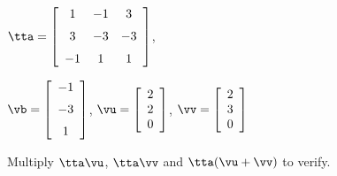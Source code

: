 {$\tta = \left[ \begin {array}{ccc} 1 & -1 & 3 \\ \noalign{\medskip} 3&-3&-3\\ \noalign{\medskip} -1&1&1 \end {array} \right] $, 

$\vb=\left[ \begin {array}{c} -1\\ \noalign{\medskip} -3 \\ \noalign{\medskip} 1 \end {array} \right] $, 
$\vu = \left[ \begin {array}{c} 2 \\ 2 \\ 0  \end{array} \right]$, 
$\vv = \left[ \begin{array}{c} 2\\ 3 \\ 0  \end{array} \right] $}
{Multiply $\tta\vu$, $\tta\vv$ and $\tta(\vu+\vv)$ to verify.}
